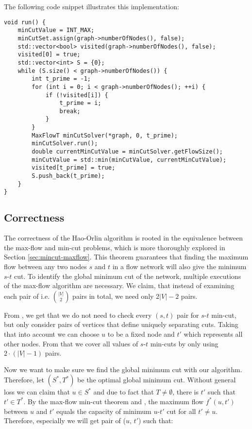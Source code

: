 The following code snippet illustrates this implementation:

\begin{verbatim}
void run() {
    minCutValue = INT_MAX;
    minCutSet.assign(graph->numberOfNodes(), false);
    std::vector<bool> visited(graph->numberOfNodes(), false);
    visited[0] = true;
    std::vector<int> S = {0};
    while (S.size() < graph->numberOfNodes()) {
        int t_prime = -1;
        for (int i = 0; i < graph->numberOfNodes(); ++i) {
            if (!visited[i]) {
                t_prime = i;
                break;
            }
        }
        MaxFlowT minCutSolver(*graph, 0, t_prime);
        minCutSolver.run();
        double currentMinCutValue = minCutSolver.getFlowSize();
        minCutValue = std::min(minCutValue, currentMinCutValue);
        visited[t_prime] = true;
        S.push_back(t_prime);
    }
}
\end{verbatim}




\subsection{Correctness}

The correctness of the Hao-Orlin algorithm is rooted in the equivalence between the max-flow and min-cut problems, which is more thoroughly explored in Section \ref{sec:mincut-maxflow}. This theorem guarantees that finding the maximum flow between any two nodes \( s \) and \( t \) in a flow network will also give the minimum \( s \)-\( t \) cut. To identify the global minimum cut of the network, multiple executions of the max-flow algorithm are necessary. We claim, that instead of examining each pair of  i.e. \( \binom{|V|}{2} \) pairs in total, we need only \(2|V|-2\) pairs.

From , we get that we do not need to check every \((s, t)\) pair for \(s\)-\(t\) min-cut, but only consider pairs of vertices that define uniquely separating cuts. Taking that into account we can choose \( u \) to be a fixed node and \( t' \) which represents all other nodes. From that we cover all values of \(s\)-\(t\) min-cuts by only using \(2 \cdot (|V| - 1)\) pairs.

Now we want to make sure we find the global minimum cut with our algorithm. Therefore, let \( (S^*, T^*) \) be the optimal global minimum cut. Without general loss we can claim that \( u \in S^* \) and due to fact that \(T \neq \emptyset\), there is \(t'\) such that \( t' \in T^* \). By the max-flow min-cut theorem and , the maximum flow \( f^*(u, t') \) between \( u \) and \( t' \) equals the capacity of minimum \( u \)-\( t' \) cut for all \(t' \neq u\). Therefore, especially we will get pair of (\(u\), \(t'\)) such that:

